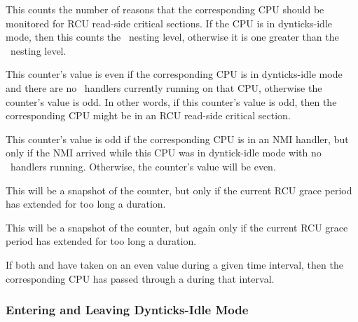 \begin{description}[style=nextline]
\item	[\tco{dynticks_nesting}]
	This counts the number of reasons that the corresponding
	CPU should be monitored for RCU read-side critical sections.
	If the CPU is in dynticks-idle mode, then this counts the
	\IRQ\ nesting level, otherwise it is one greater than the
	\IRQ\ nesting level.
\item	[\tco{dynticks}]
	This counter's value is even if the corresponding CPU is
	in dynticks-idle mode and there are no \IRQ\ handlers currently
	running on that CPU, otherwise the counter's value is odd.
	In other words, if this counter's value is odd, then the
	corresponding CPU might be in an RCU read-side critical section.
\item	[\tco{dynticks_nmi}]
	This counter's value is odd if the corresponding CPU is
	in an NMI handler, but only if the NMI arrived while this
	CPU was in dyntick-idle mode with no \IRQ\ handlers running.
	Otherwise, the counter's value will be even.
\item	[\tco{dynticks_snap}]
	This will be a snapshot of the  counter, but
	only if the current RCU grace period has extended for too
	long a duration.
\item	[\tco{dynticks_nmi_snap}]
	This will be a snapshot of the  counter, but
	again only if the current RCU grace period has extended for too
	long a duration.
\end{description}

If both  and  have taken on an even
value during a given time interval, then the corresponding CPU has
passed through a  during that interval.

\QuickQuizEnd

\subsubsection{Entering and Leaving Dynticks-Idle Mode}
\label{sec:formal:Entering and Leaving Dynticks-Idle Mode}

